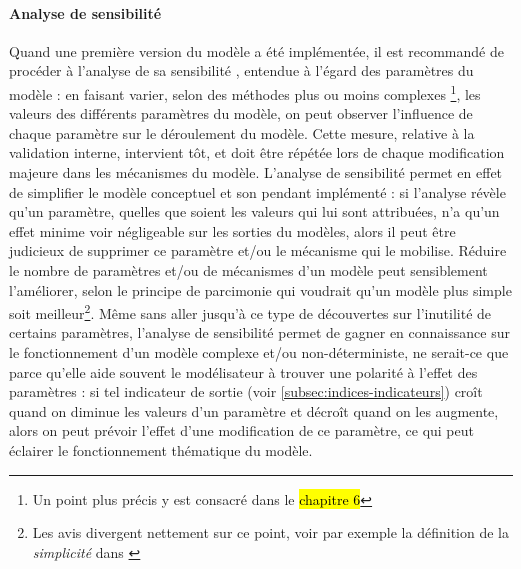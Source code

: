 \paragraph{Analyse de sensibilité}
Quand une première version du modèle a été implémentée, il est recommandé de procéder à l'analyse de sa \og sensibilité \fg{}, entendue à l'égard des paramètres du modèle : en faisant varier, selon des méthodes plus ou moins complexes
\footnote{
	Un point plus précis y est consacré dans le \hl{chapitre 6}
}, les valeurs des différents paramètres du modèle, on peut observer l'influence de chaque paramètre sur le déroulement du modèle.
Cette mesure, relative à la validation interne, intervient tôt, et doit être répétée lors de chaque modification majeure dans les mécanismes du modèle.
L'analyse de sensibilité permet en effet de simplifier le modèle conceptuel et son pendant implémenté : si l'analyse révèle qu'un paramètre, quelles que soient les valeurs qui lui sont attribuées, n'a qu'un effet minime voir négligeable sur les sorties du modèles, alors il peut être judicieux de supprimer ce paramètre et/ou le mécanisme qui le mobilise.
Réduire le nombre de paramètres et/ou de mécanismes d'un modèle peut sensiblement l'améliorer, selon le principe de parcimonie qui voudrait qu'un modèle plus simple soit meilleur\footnote{Les avis divergent nettement sur ce point, voir par exemple la définition de la \textit{simplicité} dans \cite[120]{amblard_evaluation_2006}}.
Même sans aller jusqu'à ce type de découvertes sur l'inutilité de certains paramètres, l'analyse de sensibilité permet de gagner en connaissance sur le fonctionnement d'un modèle complexe et/ou non-déterministe, ne serait-ce que parce qu'elle aide souvent le modélisateur à trouver une \og polarité \fg{} à l'effet des paramètres : si tel indicateur de sortie (voir \cref{subsec:indices-indicateurs}) croît quand on diminue les valeurs d'un paramètre et décroît quand on les augmente, alors on peut prévoir l'effet d'une modification de ce paramètre, ce qui peut éclairer le fonctionnement thématique du modèle.

